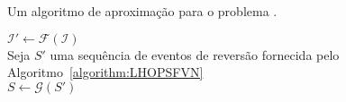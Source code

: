 \begin{algorithm}[!tbh]
  \caption{Um algoritmo de aproximação para o problema \SbIRI{}.\label{algorithm:QKCVERGO}}
  $\mathcal{I'} \gets \mathcal{F}(\mathcal{I})$ \\
  Seja $S'$ uma sequência de eventos de reversão fornecida pelo Algoritmo~\ref{algorithm:LHOPSFVN} \\
  $S\gets \mathcal{G}(S')$ \\
\end{algorithm}